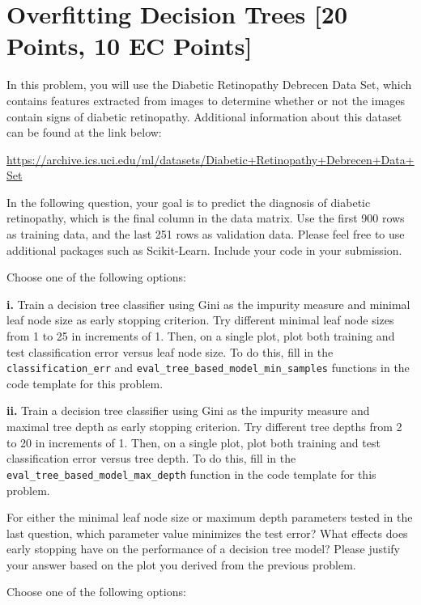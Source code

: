\newpage


\section{Overfitting Decision Trees [20 Points, 10 EC Points]}

In this problem, you will use the Diabetic Retinopathy Debrecen Data Set, which contains features extracted from images to determine whether or not the images contain signs of diabetic retinopathy. Additional information about this dataset can be found at the link below:

\url{https://archive.ics.uci.edu/ml/datasets/Diabetic+Retinopathy+Debrecen+Data+Set}

In the following question, your goal is to predict the diagnosis of diabetic retinopathy, which is the final column in the data matrix.  Use the first 900 rows as training data, and the last
251 rows as validation data. Please feel free to use additional packages such as Scikit-Learn. Include your code in your submission.

\indent\problem[7] %
Choose one of the following options: 

\textbf{i.} Train a decision tree classifier using Gini as the impurity measure and minimal leaf node size as early stopping criterion. Try different minimal leaf node sizes from 1 to 25 in increments of 1. Then, on a single plot, plot both training and test classification error versus leaf node size. To do this, fill in the \texttt{classification_err} and \texttt{eval_tree_based_model_min_samples} functions in the code template for this problem.



\textbf{ii.} Train a decision tree classifier using Gini as the impurity measure and maximal tree depth as early stopping criterion. Try different tree depths from 2 to 20 in increments of 1. Then, on a single plot, plot both training and test classification error versus tree depth. To do this, fill in the \texttt{eval_tree_based_model_max_depth} function in the code template for this problem.

\problem[3]
For either the minimal leaf node size or maximum depth parameters tested in the last question, which parameter value minimizes the test error? What effects does early stopping have on the performance of a decision tree model?
Please justify your answer based on the plot you derived from the previous problem.

\problem[2] %
Choose one of the following options: 


